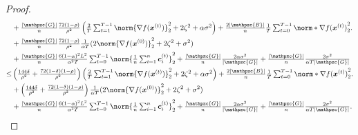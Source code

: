 \documentclass{article}
\newcommand{\gset}{\ensuremath{{\mathpzc{G}}}}
\newcommand{\bset}{\ensuremath{{\mathpzc{B}}}}
\begin{document}
\begin{proof}
\begin{align*}
        & +
    \tfrac{|\gset|}{n} \tfrac{72(1-\rho)}{\rho^2} \left(\tfrac{2}{T}\tsum_{t=1}^{T-1} \norm{\nabla f(\xx^{(t)}) }_2^2
    +  2  \zeta^2
    + \alpha\sigma^2 \right)
    + \tfrac{2|\bset|}{n}\tfrac{1}{T}\tsum_{t=0}^{T-1} \norm*{ \nabla f(\xx^{(t)}) }_2^2.                                                                                                                                                                   \\
        & + \tfrac{|\gset|}{n} \tfrac{72(1-\rho)}{\rho^2} \tfrac{1}{\alpha T}(2\norm{\nabla f(\xx^{(0)}) }_2^2
    + 2 \zeta^2 + \sigma^2)                                                                                                                                                                                                                                 \\
        & + \tfrac{|\gset|}{n} \tfrac{6(1-\alpha)^2L^2}{\alpha^2T} \tsum_{t=0}^{T-1}
    \norm{ \tfrac{1}{n} \tsum_{i=1}^n \cc_i^{(t)} }_2^2
    + \tfrac{|\gset|}{n} \tfrac{2\alpha\sigma^2}{|\gset|} + \tfrac{|\gset|}{n} \tfrac{2\sigma^2}{ \alpha  T|\gset|}                                                                                                                                         \\
    \le &
    \left( \tfrac{144\delta}{\rho^2} +\tfrac{72(1-\delta)(1-\rho)}{\rho^2}\right) \left(\tfrac{2}{T}\tsum_{t=1}^{T-1} \norm{\nabla f(\xx^{(t)}) }_2^2
    +  2  \zeta^2
    + \alpha\sigma^2 \right)
    + \tfrac{2|\bset|}{n}\tfrac{1}{T}\tsum_{t=0}^{T-1} \norm*{ \nabla f(\xx^{(t)}) }_2^2.                                                                                                                                                                   \\
        & + \left( \tfrac{144\delta}{\rho^2} +\tfrac{72(1-\delta)(1-\rho)}{\rho^2}\right) \tfrac{1}{\alpha T}(2\norm{\nabla f(\xx^{(0)}) }_2^2
    + 2 \zeta^2 + \sigma^2)                                                                                                                                                                                                                                 \\
        & + \tfrac{|\gset|}{n} \tfrac{6(1-\alpha)^2L^2}{\alpha^2T} \tsum_{t=0}^{T-1}
    \norm{ \tfrac{1}{n} \tsum_{i=1}^n \cc_i^{(t)} }_2^2
    + \tfrac{|\gset|}{n} \tfrac{2\alpha\sigma^2}{|\gset|} + \tfrac{|\gset|}{n} \tfrac{2\sigma^2}{ \alpha  T|\gset|}.
  \end{align*}
\end{proof}
\end{document}
